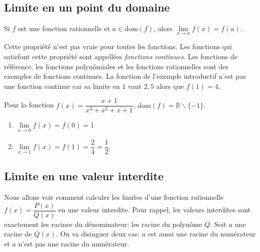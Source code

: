 \documentclass[a4paper,12pt]{report}
\newcommand{\IR}{\mathbb{R}}
\newcommand{\dom}{\mathrm{dom}}
\begin{document}
\subsection{Limite en un point du domaine}
\label{sec:org0bdce22}
\begin{propriete}
Si \(f\) est une fonction rationnelle et \(a\in\dom(f)\), alors
\(\lim\limits_{x\to a}f(x)=f(a)\).
\end{propriete}
\begin{remarque}
Cette propriété n'est pas vraie pour toutes les fonctions. Les
fonctions qui satisfont cette propriété sont appellées \emph{fonctions
continues}. Les fonctions de référence,
les fonctions polynômiales et les fonctions rationnelles sont des
exemples de fonctions continues. La fonction de l'exemple introductif
n'est pas une fonction continue car sa limite en \(1\) vaut \(2{,}5\) alors
que \(f(1)=4\).
\end{remarque}

\begin{exemple}
Pour la fonction \(f(x)=\dfrac{x+1}{x^3+x^2+x+1}\),
\(\dom(f)=\IR\backslash\{-1\}\).
\begin{enumerate}
\item \(\lim\limits_{x\to 0}f(x)=f(0)=1\)
\item \(\lim\limits_{x\to 1}f(x)=f(1)=\dfrac{2}{4}=\dfrac{1}{2}\).
\end{enumerate}
\end{exemple}

\subsection{Limite en une valeur interdite}
\label{sec:orgc23dc94}
Nous allons voir comment calculer les limites d'une fonction
rationnelle \(f(x)=\dfrac{P(x)}{Q(x)}\) en une valeur interdite. Pour
rappel, les valeurs interdites sont exactement les racines du
dénominateur: les racine du polynôme \(Q\). Soit \(a\) une racine de
\(Q(x)\). On va disinguer deux cas: \(a\) est aussi une racine du
numérateur et \(a\) n'est pas une racine du numérateur.
\end{document}
